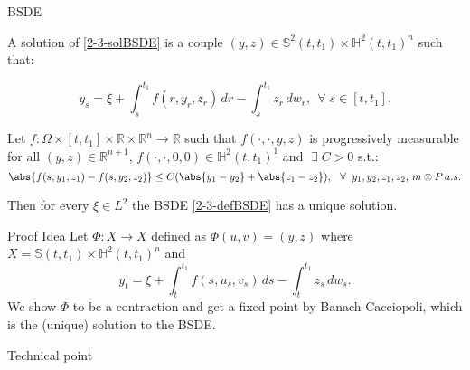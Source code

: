 \documentclass[10pt, compress]{beamer}
\newcommand{\R}{\mathbb{R}}
\let\oldforall\forall
\renewcommand{\forall}{\; \oldforall \;}
\let\oldexists\exists
\renewcommand{\exists}{\; \oldexists \;}
\begin{document}
\begin{frame}{BSDE}
    \begin{definition}
    A solution of \ref{2-3-solBSDE} is a couple $(y,z)\in\mathbb{S}^2(t,t_1)\times\mathbb{H}^2(t,t_1)^n$ such that:
    
    \[y_s = \xi + \int_s^{t_1} f(r,y_r,z_r)\,dr - \int_s^{t_1} z_r\,dw_r,\,\forall s\in[t,t_1].\] 
 
\end{definition}

\begin{theorem}
    Let $f:\Omega\times[t,t_1]\times\R\times\R^n\rightarrow \R$ such that $f(\cdot,\cdot,y,z)$ is progressively measurable for all 
    $(y,z)\in\R^{n+1}$, $f(\cdot,\cdot,0,0)\in\mathbb{H}^2(t,t_1)^1$ and $\exists C>0$ s.t.:
    \begin{equation}
        \abs{f(s,y_1,z_1)-f(s,y_2,z_2)} \leq C(\abs{y_1-y_2} + \abs{z_1-z_2}),\,\forall y_1,y_2,z_1,z_2,\, m\otimes P\,a.s.
    \end{equation}

    Then for every $\xi\in L^2$ the BSDE \ref{2-3-defBSDE} has a unique solution.
\end{theorem}
\end{frame}

\begin{frame}{Proof Idea}
    Let $\Phi:X\rightarrow X$ defined as $\Phi(u,v)=(y,z)$ where $X=\mathbb{S}(t,t_1)\times\mathbb{H}^2(t,t_1)^n$ and 
    \[y_t = \xi + \int_t^{t_1} f(s,u_s,v_s)\,ds - \int_t^{t_1} z_s\,dw_s.\]
    We show $\Phi$ to be a contraction and get a fixed point by Banach-Cacciopoli, which is the (unique) solution to the BSDE. 

    Technical point 
    
\end{frame}
\end{document}
